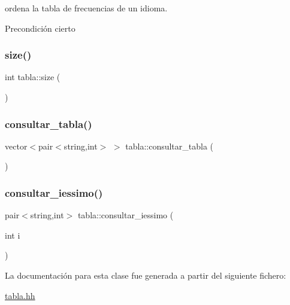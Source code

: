 ordena la tabla de frecuencias de un idioma. 

\begin{DoxyPrecond}{Precondición}
cierto 
\end{DoxyPrecond}
\mbox{\label{classtabla_ade5cabea713c5247052a4ea28462945d}} 
\subsubsection{\texorpdfstring{size()}{size()}}
{\footnotesize\ttfamily int tabla\+::size (\begin{DoxyParamCaption}{ }\end{DoxyParamCaption})}

\mbox{\label{classtabla_a0debfe16db434472d3d1ec409f2ca6b5}} 
\subsubsection{\texorpdfstring{consultar\+\_\+tabla()}{consultar\_tabla()}}
{\footnotesize\ttfamily vector$<$pair$<$string,int$>$ $>$ tabla\+::consultar\+\_\+tabla (\begin{DoxyParamCaption}{ }\end{DoxyParamCaption})}

\mbox{\label{classtabla_aab5168294f0ecdfe4c3f22761a78d31f}} 
\subsubsection{\texorpdfstring{consultar\+\_\+iessimo()}{consultar\_iessimo()}}
{\footnotesize\ttfamily pair$<$string,int$>$ tabla\+::consultar\+\_\+iessimo (\begin{DoxyParamCaption}\item[{int}]{i }\end{DoxyParamCaption})}



La documentación para esta clase fue generada a partir del siguiente fichero\+:\begin{DoxyCompactItemize}
\item 
\hyperlink{tabla_8hh}{tabla.\+hh}\end{DoxyCompactItemize}
